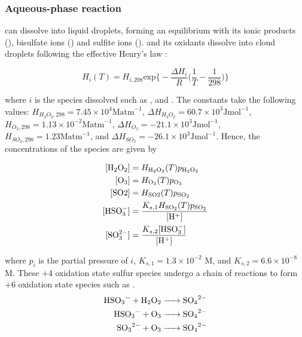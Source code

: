 \subsubsection{Aqueous-phase reaction}

 can dissolve into liquid droplets, forming an equilibrium with its ionic products (), bisulfate ions () and sulfite ions ().  and its oxidants dissolve into cloud droplets following the effective Henry's law \citep{seinfeldAtmosphericChemistryPhysics2016}: 

\begin{equation}
    H_i(T) = H_{i,298}\mathrm{exp} \bigg\{ -\frac{\Delta H_i}{R} \bigg( \frac{1}{T} - \frac{1}{298} \bigg) \bigg\}
\end{equation}

where $i$ is the species dissolved such as ,  and .  The constants take the following values: 
$H_{H_2O_2, 298}=7.45 \times 10^4 \mathrm{Matm}^{-1}$, 
$\Delta H_{H_2O_2} = 60.7 \times 10^3 \mathrm{Jmol}^{-1}$, 
$H_{O_3, 298}=1.13 \times 10^{-2} \mathrm{Matm}^{-1}$, 
$\Delta H_{O_3} = -21.1 \times 10^3 \mathrm{Jmol}^{-1}$, 
$H_{SO_2, 298}=1.23 \mathrm{Matm}^{-1}$, and
$\Delta H_{SO_2}=-26.1 \times 10^3 \mathrm{Jmol}^{-1}$. 
Hence, the concentrations of the species are given by

\begin{equation}
    \begin{aligned}
        \relax[\mathrm{H_2O_2}] & = H_{\mathrm{H_2O_2}}(T)p_{\mathrm{H_2O_2}} \\
        [\mathrm{O_3}] & = H_{\mathrm{O_3}}(T)p_{\mathrm{O_3}} \\
        [\mathrm{SO2}] & = H_{\mathrm{SO2}}(T)p_{\mathrm{SO_2}} \\
        [\mathrm{HSO_3^-}] & = \frac{K_{s,1}H_{\mathrm{SO_2}}(T)p_{\mathrm{SO_2}}}{[\mathrm{H^+}]}\\
        [\mathrm{SO_3^{2-}}] & = \frac{K_{s,2}[\mathrm{HSO_3^-}]}{[\mathrm{H^+}]}\\
    \end{aligned}
\end{equation}

where $p_i$ is the partial pressure of $i$,  
$K_{s,1} = 1.3 \times 10^{-2}$ M, and 
$K_{s,2} = 6.6 \times 10^{-8}$ M.  
These +4 oxidation state sulfur species undergo a chain of reactions to form +6 oxidation state species such as . 
\begin{align}
    \ce{HSO3- + H2O2 &-> SO4^2-} \\
    \ce{HSO3- + O3 &-> SO4^2-} \\
    \ce{SO3^2- + O3 &-> SO4^2-} 
\end{align}

